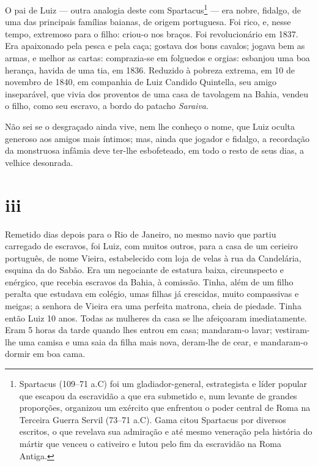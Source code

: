 O pai de Luiz --- outra analogia deste com Spartacus\footnote{
  Spartacus (109--71 a.C) foi um gladiador-general, estrategista e \label{espartacos}
  líder popular que escapou da escravidão a que era submetido e, num
  levante de grandes proporções, organizou um exército que enfrentou o
  poder central de Roma na Terceira Guerra Servil (73--71 a.C). Gama
  citou Spartacus por diversos escritos, o que revelava sua admiração e
  até mesmo veneração pela história do mártir que venceu o cativeiro e
  lutou pelo fim da escravidão na Roma Antiga.} --- era nobre, fidalgo,
de uma das principais famílias baianas, de origem portuguesa. Foi rico,
e, nesse tempo, extremoso para o filho: criou-o nos braços. Foi
revolucionário em 1837. Era apaixonado pela pesca e pela caça; gostava
dos bons cavalos; jogava bem as armas, e melhor as cartas: comprazia-se
em folguedos e orgias: esbanjou uma boa herança, havida de uma tia, em
1836. Reduzido à pobreza extrema, em 10 de novembro de 1840, em
companhia de Luiz Candido Quintella, seu amigo inseparável, que vivia
dos proventos de uma casa de tavolagem na Bahia, vendeu o filho, como
seu escravo, a bordo do patacho \emph{Saraiva}.

Não sei se o desgraçado ainda vive, nem lhe conheço o nome, que Luiz
oculta generoso aos amigos mais íntimos; mas, ainda que jogador e
fidalgo, a recordação da monstruosa infâmia deve ter-lhe esbofeteado, em
todo o resto de seus dias, a velhice desonrada.

\section*{iii}

Remetido dias depois para o Rio de Janeiro, no mesmo navio que partiu
carregado de escravos, foi Luiz, com muitos outros, para a casa de um
cerieiro português, de nome Vieira, estabelecido com loja de velas à rua
da Candelária, esquina da do Sabão. Era um negociante de estatura baixa,
circunspecto e enérgico, que recebia escravos da Bahia, à comissão.
Tinha, além de um filho peralta que estudava em colégio, umas filhas já
crescidas, muito compassivas e meigas; a senhora de Vieira era uma
perfeita matrona, cheia de piedade. Tinha então Luiz 10 anos. Todas as
mulheres da casa se lhe afeiçoaram imediatamente. Eram 5 horas da tarde
quando lhes entrou em casa; mandaram-o lavar; vestiram-lhe uma camisa e
uma saia da filha mais nova, deram-lhe de cear, e mandaram-o dormir em
boa cama.

